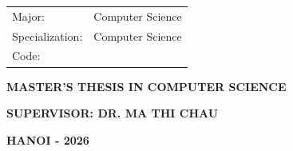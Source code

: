 \vspace{0.5cm}
\begin{flushleft}
\hspace*{3cm}\begin{tabular}{ll}
	{\fontsize{14}{16}\selectfont Major:} & {\fontsize{14}{16}\selectfont Computer Science} \\
	{\fontsize{14}{16}\selectfont Specialization:} & {\fontsize{14}{16}\selectfont Computer Science} \\
	{\fontsize{14}{16}\selectfont Code:} & {\fontsize{14}{16}\selectfont 7480101}
\end{tabular}
\end{flushleft}

\vspace{1cm}
\begin{center}
	{\fontsize{14}{16}\selectfont \textbf{MASTER'S THESIS IN COMPUTER SCIENCE}}
\end{center}

\vspace{2cm}
\begin{center}
	{\fontsize{14}{16}\selectfont \textbf{SUPERVISOR: DR. MA THI CHAU}}
\end{center}

\vfill
\begin{center}
	{\fontsize{14}{16}\selectfont \textbf{HANOI - 2026}}
	\vspace{10mm}
\end{center}


